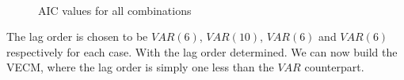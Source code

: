\begin{figure}[H]
  \centering
  \quad
  \\
  \quad
  \caption{AIC values for all combinations}
  \label{fig:AIC_plots}
\end{figure}
\noindent The lag order is chosen to be $VAR(6)$, $VAR(10)$, $VAR(6)$ and $VAR(6)$ respectively for each case. With the lag order determined. We can now build the VECM, where the lag order is simply one less than the $VAR$ counterpart.

